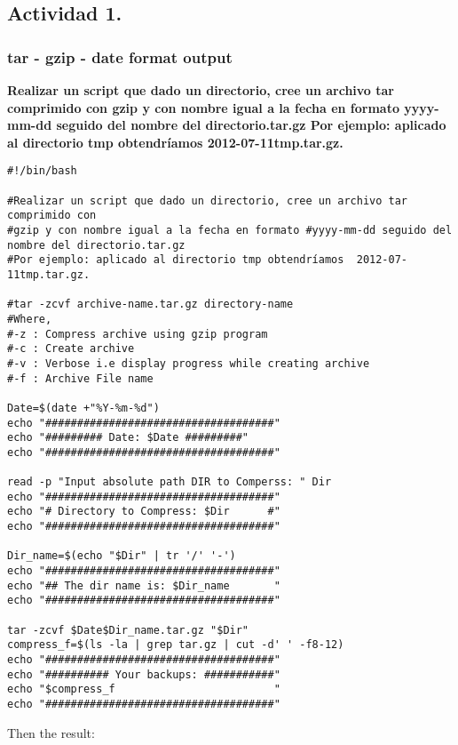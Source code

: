 \documentclass[a4paper,11pt,spanish]{article} %
\newenvironment{myscriptlisting}
{\begin{list}{}{\setlength{\leftmargin}{1em}}\item\scriptsize\bfseries}
{\end{list}}
\begin{document}
\subsection{Actividad 1.}

\subsubsection{tar - gzip - date format output}

\textbf{Realizar un script que dado un directorio, cree un archivo tar comprimido con gzip y con nombre igual a la fecha en formato yyyy-mm-dd seguido del nombre del directorio.tar.gz
Por ejemplo: aplicado al directorio tmp obtendríamos  2012-07-11tmp.tar.gz.}\\

\begin{myscriptlisting}
 \begin{verbatim}
#!/bin/bash

#Realizar un script que dado un directorio, cree un archivo tar comprimido con
#gzip y con nombre igual a la fecha en formato #yyyy-mm-dd seguido del nombre del directorio.tar.gz
#Por ejemplo: aplicado al directorio tmp obtendríamos  2012-07-11tmp.tar.gz.

#tar -zcvf archive-name.tar.gz directory-name
#Where,
#-z : Compress archive using gzip program
#-c : Create archive
#-v : Verbose i.e display progress while creating archive
#-f : Archive File name

Date=$(date +"%Y-%m-%d")
echo "####################################"
echo "######### Date: $Date #########"
echo "####################################"

read -p "Input absolute path DIR to Comperss: " Dir
echo "####################################"
echo "# Directory to Compress: $Dir      #"
echo "####################################"

Dir_name=$(echo "$Dir" | tr '/' '-')
echo "####################################"
echo "## The dir name is: $Dir_name       "
echo "####################################"

tar -zcvf $Date$Dir_name.tar.gz "$Dir"
compress_f=$(ls -la | grep tar.gz | cut -d' ' -f8-12)
echo "####################################"
echo "########## Your backups: ###########"
echo "$compress_f                         "
echo "####################################"
 \end{verbatim}
\end{myscriptlisting}

Then the result:
\end{document}
